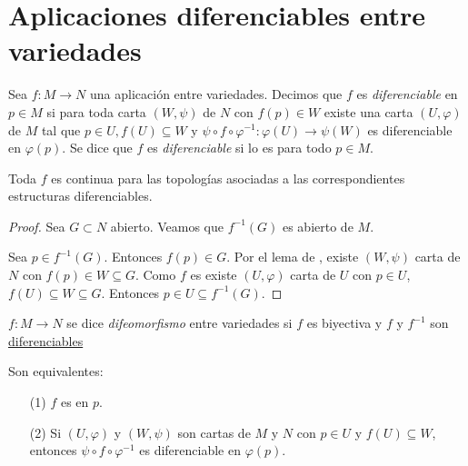 \documentclass[../VD.tex]{subfiles}
\begin{document}
\setcounter{chapter}{1}
\chapter{Aplicaciones diferenciables entre variedades}
\label{chap:app}

\begin{definition}[diferenciable]
  \label{def:diferenciable}
  Sea \(f \colon M \to N\) una aplicación entre variedades. Decimos que \(f\) es
  \emph{diferenciable} en \(p \in M\) si para toda carta \((W,\psi)\) de \(N\) con \(f(p)
  \in W\) existe una carta \((U,\varphi)\) de \(M\) tal que \(p \in U, f(U)
  \subseteq W\) y \(\psi \circ f \circ \varphi^{-1} \colon \varphi(U) \to
  \psi(W)\) es diferenciable en \(\varphi(p)\). Se dice que \(f\) es \emph{diferenciable}
  si lo es para todo \(p \in M\).
\end{definition}

\begin{lemma}
  Toda \(f\)  es continua para las topologías
  asociadas a las correspondientes estructuras diferenciables.
\end{lemma}

\begin{proof}
  Sea \(G \subset N\) abierto. Veamos que \(f^{-1}(G)\) es abierto de \(M\).

  Sea \(p \in f^{-1}(G)\). Entonces \(f(p) \in G\). Por el
  lema de , existe
  \((W,\psi)\) carta de \(N\) con \(f(p) \in W \subseteq G\). Como \(f\) es
   existe \((U,\varphi)\) carta de \(U\) con \(p \in
  U\), \(f(U) \subseteq W \subseteq G\). Entonces \(p \in U \subseteq
  f^{-1}(G)\). 
\end{proof}

\begin{definition}[difeomorfismo]
  \label{def:difeomorfismo}
  \(f \colon M \to N\) se dice \emph{difeomorfismo} entre variedades si \(f\) es
  biyectiva y \(f\) y \(f^{-1}\) son \hyperref[def:diferenciable]{diferenciables}
\end{definition}

\begin{lemma}
	Son equivalentes:
	\begin{enumerate}
	\item [(1)] \(f\) es  en \(p\).
	\item [(2)] Si \((U,\varphi)\) y \((W,\psi)\) son cartas de \(M\) y \(N\) con \(p\in U\) y \(f(U)\subseteq W\), entonces \(\psi \circ f \circ \varphi^{-1}\) es diferenciable en \(\varphi(p)\).
	\end{enumerate}
\end{lemma}
\end{document}
